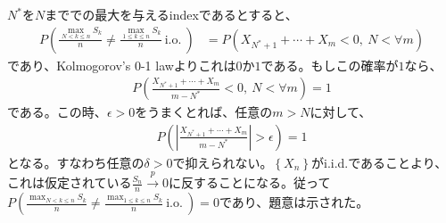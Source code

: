 \documentclass{article}
\begin{document}
$N^{*}$を$N$まででの最大を与えるindexであるとすると、
\begin{align*}
	P\left( \frac{\max_{N<k\leq n} S_k}{n} \neq \frac{\max_{1\leq k\leq n} S_k}{n}\ \text{i.o.}\ \right) &= P\left( X_{N^{*} + 1} + \cdots + X_m < 0,\ N < \forall m \right)
\end{align*}
であり、Kolmogorov's 0-1 lawよりこれは$0$か$1$である。もしこの確率が$1$なら、
\begin{align*}
	P\left( \frac{X_{N^{*} + 1} + \cdots + X_m}{m-N^{*}} < 0,\ N < \forall m \right) = 1
\end{align*}
である。この時、$\epsilon > 0$をうまくとれば、任意の$m > N$に対して、
\begin{align*}
	P\left( \left| \frac{X_{N^{*} + 1} + \cdots + X_m}{m-N^{*}}\right| > \epsilon \right) = 1
\end{align*}
となる。すなわち任意の$\delta > 0$で抑えられない。$\left\{ X_n \right\}$がi.i.d.であることより、これは仮定されている$\frac{S_n}{n} \xrightarrow{p} 0$に反することになる。従って$P\left( \frac{\max_{N<k\leq n} S_k}{n} \neq \frac{\max_{1\leq k\leq n} S_k}{n}\ \text{i.o.}\ \right) = 0$であり、題意は示された。
\end{document}

